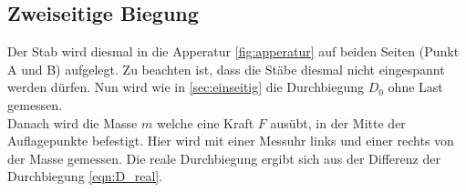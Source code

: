 \subsection{Zweiseitige Biegung}
Der Stab wird diesmal in die Apperatur \ref{fig:apperatur} auf beiden Seiten (Punkt A und B) aufgelegt.
Zu beachten ist, dass die Stäbe diesmal nicht eingespannt werden dürfen.
Nun wird wie in \autoref{sec:einseitig} die Durchbiegung $D_0$ ohne Last gemessen.\\
Danach wird die Masse $m$ welche eine Kraft $F$ ausübt, in der Mitte der Auflagepunkte befestigt.
Hier wird mit einer Messuhr links und einer rechts von der Masse gemessen.
Die reale Durchbiegung ergibt sich aus der Differenz der Durchbiegung \eqref{eqn:D_real}.